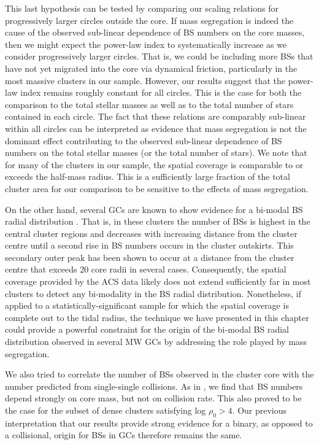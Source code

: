 This last hypothesis can be tested by comparing our scaling
relations for progressively larger circles outside the core.  If mass
segregation is indeed the cause of the observed sub-linear dependence
of BS numbers on the core masses, then we might expect the power-law
index to systematically increase as we consider progressively larger
circles.  That is, we could be including more BSs that have not yet migrated
into the core via dynamical friction, particularly in the most massive
clusters in our sample.  However, our results suggest 
that the power-law index remains roughly constant for all circles.  
This is the case for both the comparison to the total stellar masses as
well as to the total number of stars contained in each circle.  
The fact that these relations are comparably sub-linear within all
circles can be interpreted as evidence that mass segregation is not
the dominant effect contributing to the 
observed sub-linear dependence of BS numbers on the total stellar
masses (or the total number of stars).  We note that for many of the
clusters in our sample, the spatial coverage is comparable to or
exceeds the half-mass radius.  This is a sufficiently large fraction
of the total cluster area for our comparison to be sensitive to the
effects of mass segregation.  

On the other hand, several GCs are known
to show evidence for a bi-modal BS radial distribution
\citep[e.g.][]{mapelli06, lanzoni07}.  That is, in
these clusters the number of BSs is highest in the central cluster
regions and decreases with increasing distance from the cluster centre
until a second rise in BS numbers occurs in the cluster outskirts.
This secondary outer peak has been shown to occur at a distance 
from the cluster centre that exceeds 20 core radii in several
cases.  Consequently, 
the spatial coverage provided by the ACS data likely does not extend
sufficiently far in most clusters to 
detect any bi-modality in the BS radial distribution.  Nonetheless,
if applied to a 
statistically-significant sample for which the spatial coverage
is complete out to the tidal radius, the technique we have
presented in this chapter could provide a powerful constraint for the
origin of the 
bi-modal BS radial distribution observed in several MW GCs by
addressing the role played by mass segregation.

We also tried to correlate the number of BSs observed in 
the cluster core with the number predicted from single-single 
collisions.  As in \citet{knigge09}, we find that BS numbers depend
strongly on
core mass, but not on collision rate.  This also proved to be the case
for the subset of 
dense clusters satisfying log $\rho_0 > 4$.  Our previous
interpretation 
that our results provide strong evidence for a binary, as opposed to a
collisional, origin for BSs in GCs therefore remains the same.

